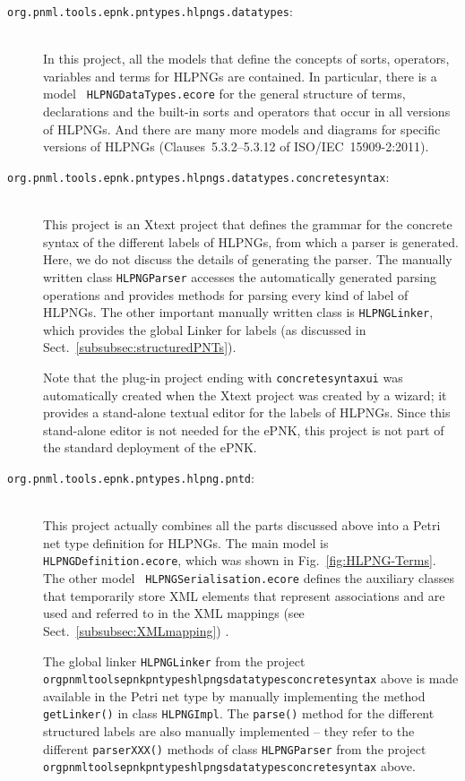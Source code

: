 \begin{description}
\item[{\tt org.pnml.tools.epnk.pntypes.hlpngs.datatypes}:] ~\\
   In this project, all
   the models that define the concepts of sorts, operators, variables and terms
   for HLPNGs are contained. In particular, there is a model  {\tt
   HLPNGDataTypes.ecore} for the general structure of terms, declarations
   and the built-in sorts and operators that occur in all versions of HLPNGs.
   And there are many more models and diagrams for specific versions of
   HLPNGs (Clauses~5.3.2--5.3.12 of ISO/IEC~15909-2:2011).
 
\item[{\tt org.pnml.tools.epnk.pntypes.hlpngs.datatypes.concretesyntax}:] ~\\
   This project is an Xtext project that defines the grammar for the concrete
   syntax of the different labels of HLPNGs, from which a parser is generated.
   Here, we do not discuss the details of generating the parser. The manually written
   class {\tt HLPNGParser} accesses the automatically generated parsing
   operations and provides methods for parsing every
   kind of label of HLPNGs. The other important manually written class is
   {\tt HLPNGLinker}, which provides the global Linker for labels (as discussed
   in Sect.~\ref{subsubsec:structuredPNTs}).

   Note that the plug-in project ending with 
   {\tt concretesyntax\qnsep{}ui} was
   automatically created when the Xtext project was created by a wizard;
   it provides a stand-alone textual editor for the labels of HLPNGs.
   Since this stand-alone editor is not needed for the ePNK, this project is
   not part of the standard deployment of the ePNK. 

\item[{\tt org.pnml.tools.epnk.pntypes.hlpng.pntd}:] ~\\
   This project actually
   combines all the parts discussed above into a Petri net type definition for
   HLPNGs. The main model is {\tt HLPNG\optsep{}Definition.ecore}, which was
   shown in Fig.~\ref{fig:HLPNG-Terms}. The other model {\tt
   HLPNGSerialisation.ecore} defines the auxiliary classes that temporarily
   store XML elements that represent associations and are used and referred to
   in the XML mappings (see Sect.~\ref{subsubsec:XMLmapping}) .
   
   The global linker {\tt HLPNGLinker} from the project 
   {\tt org\qnsep{}pnml\qnsep{}tools\qnsep{}epnk\qnsep{}pntypes\qnsep{}hlpngs\qnsep{}datatypes\qnsep{}concretesyntax}
   above is made available in the Petri net type by
   manually implementing the method {\tt getLinker()} in class {\tt HLPNGImpl}.
   The {\tt parse()} method for the different structured labels are also
   manually implemented -- they refer to the different {\tt parserXXX()} methods
   of class {\tt HLPNGParser}%
   from the project
   {\tt org\qnsep{}pnml\qnsep{}tools\qnsep{}epnk\qnsep{}pntypes\qnsep{}hlpngs\qnsep{}datatypes\qnsep{}concretesyntax}
   above.
   

\end{description}
